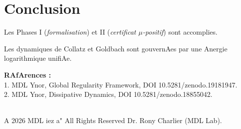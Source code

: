 ﻿\documentclass[12pt]{article}
\begin{document}
\section*{Conclusion} 

Les Phases I (\emph{formalisation}) et II (\emph{certificat $\mu$-positif}) sont accomplies.

Les dynamiques de Collatz et Goldbach sont gouvernAes par une Anergie logarithmique unifiAe.



\bigskip 

\noindent\textbf{RAfArences :}\\ 

1. MDL Ynor, Global Regularity Framework, DOI 10.5281/zenodo.19181947. \\

2. MDL Ynor, Dissipative Dynamics, DOI 10.5281/zenodo.18855042.



\medskip

 \\

A 2026 MDL iez a" All Rights Reserved Dr. Rony Charlier (MDL Lab).
\end{document}
